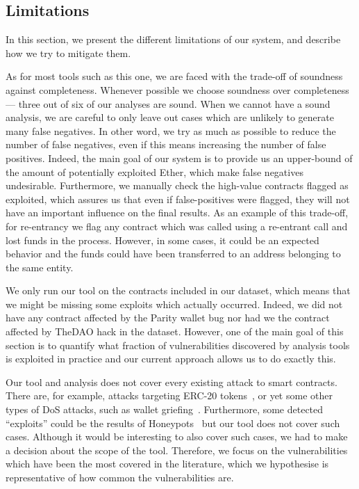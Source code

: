 \subsection{Limitations}
\label{sec:limitations} 
In this section, we present the different limitations of our system, and describe how we try to mitigate them.

 As for most tools such as this one, we are faced with the trade-off of soundness against completeness. Whenever possible we choose soundness over completeness --- three out of six of our analyses are sound. When we cannot have a sound analysis, we are careful to only leave out cases which are unlikely to generate many false negatives. In other word, we try as much as possible to reduce the number of false negatives, even if this means increasing the number of false positives. Indeed, the main goal of our system is to provide us an upper-bound of the amount of potentially exploited Ether, which make false negatives undesirable. Furthermore, we manually check the high-value contracts flagged as exploited, which assures us that even if false-positives were flagged, they will not have an important influence on the final results. As an example of this trade-off, for re-entrancy we flag any contract which was called using a re-entrant call and lost funds in the process. However, in some cases, it could be an expected behavior and the funds could have been transferred to an address belonging to the same entity.

 We only run our tool on the contracts included in our dataset, which means that we might be missing some exploits which actually occurred. Indeed, we did not have any contract affected by the Parity wallet bug nor had we the contract affected by TheDAO hack in the dataset. However, one of the main goal of this section is to quantify what fraction of vulnerabilities discovered by analysis tools is exploited in practice and our current approach allows us to do exactly this.

 Our tool and analysis does not cover every existing attack to smart contracts. There are, for example, attacks targeting ERC-20 tokens~\cite{8802438}, or yet some other types of DoS attacks, such as wallet griefing~\cite{Grech2018}.
Furthermore, some detected ``exploits'' could be the results of Honeypots~\cite{236240} but our tool does not cover such cases.
Although it would be interesting to also cover such cases, we had to make a decision about the scope of the tool. Therefore, we focus on the vulnerabilities which have been the most covered in the literature, which we hypothesise is representative of how common the vulnerabilities are.
